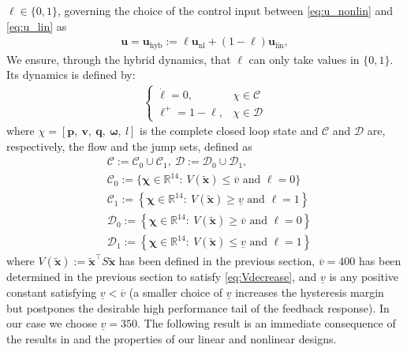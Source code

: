 $\ell \in \{0,1\}$, governing the choice of the control input 
between \eqref{eq:u_nonlin} and \eqref{eq:u_lin} as
\begin{align}
\label{eq:u_hybrid}
  \boldsymbol{u}=\boldsymbol{u}_{\text{hyb}} := \ell \boldsymbol{u}_{\text{nl}} + (1-\ell) \boldsymbol{u}_{\text{lin}},
\end{align}
We ensure, through the hybrid dynamics, that $\ell$ can only take values in $\{0,1\}$. 
Its dynamics is defined by: 
\begin{align*}
    \left\{
        \begin{array}{ll}
            \dot \ell = 0,& \chi \in \mathcal{C}\\
            \ell^{+} = 1-\ell,& \chi \in \mathcal{D}
        \end{array}
    \right.
\end{align*}
where $\chi = \left[\boldsymbol{p},~ \boldsymbol{v},~ \boldsymbol{q},~  \boldsymbol{\omega},~ l\right]$ is the complete closed loop state and $\mathcal{C}$ and $\mathcal{D}$ are, respectively, the flow and the jump sets, defined as
\begin{align*}
    & \mathcal{C} := \mathcal{C}_{0} \cup \mathcal{C}_{1}, ~ \mathcal{D} := \mathcal{D}_{0} \cup \mathcal{D}_{1},\\
   & \mathcal{C}_{0} :=\{\boldsymbol{\chi} \in \mathbb{R}^{14}:~ V(\boldsymbol{\tilde x}) \le \overline{v} \mbox{ and } \ell=0\}\\
   & \mathcal{C}_{1} :=\left\{\boldsymbol{\chi} \in \mathbb{R}^{14}:~ V(\boldsymbol{\tilde x}) \ge \underline{v} \mbox{ and } \ell=1 \right\}\\
   & \mathcal{D}_{0} :=\left\{\boldsymbol{\chi} \in \mathbb{R}^{14}:~ V(\boldsymbol{\tilde x}) \geq \overline{v}\mbox{ and } \ell=0 \right\}\\
   & \mathcal{D}_{1} :=\left\{\boldsymbol{\chi} \in \mathbb{R}^{14}:~ V(\boldsymbol{\tilde x}) \leq \underline{v}\mbox{ and } \ell=1 \right\}
\end{align*}
where $V(\boldsymbol{\tilde x}) := \boldsymbol{\tilde x}^\top S \boldsymbol{\tilde x}$  has been defined in the previous section, $\overline{v}=400$ has been determined in the previous section to satisfy \eqref{eq:Vdecrease},
 and $\underline{v}$ is any positive constant satisfying $\underline{v}<\overline{v}$ (a smaller choice of $\underline{v}$ increases the hysteresis margin but postpones the desirable high performance tail of the feedback response). In our case we choose $\underline{v}= 350$.
%
The following result is an immediate consequence of the results in \cite[Ex. 1.7]{65} and the properties of our linear and nonlinear designs.

